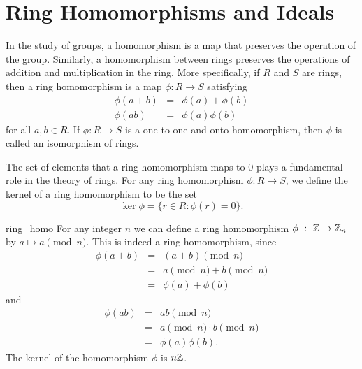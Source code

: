  
 
\section{Ring Homomorphisms and Ideals}
 
 
In the study of groups, a homomorphism is a map that preserves the
operation of the group.  Similarly, a homomorphism between rings
preserves the operations of addition and multiplication in the ring.
More specifically, if  $R$ and $S$ are rings, then   a {\bfi ring
homomorphism\/} is a
map $\phi : R \rightarrow S$ satisfying  
\begin{eqnarray*}
\phi( a + b ) & = & \phi( a ) + \phi(b) \\
\phi( a b ) & = & \phi( a ) \phi(b)
\end{eqnarray*}
for all $a, b \in R$.  
If $\phi : R \rightarrow S$ is a one-to-one and onto homomorphism,
then $\phi$ is called an {\bfi
isomorphism\/} of rings.   
 
 
The set of elements that a ring homomorphism maps to $0$ plays a
fundamental role in the theory of rings. For any ring homomorphism
$\phi : R \rightarrow S$, we define the {\bfi
kernel\/} of a ring homomorphism to be the set
\[
\ker \phi = \{ r \in R : \phi( r ) = 0 \}.
\]
 
 
\begin{example}{ring_homo}
For any integer $n$ we can define a ring homomorphism $\phi~:~{\Bbb Z}
\rightarrow {\Bbb Z}_n$ by $a \mapsto a \pmod{n}$. This is indeed a
ring homomorphism, since 
\begin{eqnarray*}
\phi( a + b )  & = & (a + b) \pmod{n} \\
 & = &  a \pmod{n} + b \pmod{n}\\
 & = & \phi( a ) + \phi(b)
\end{eqnarray*}
and
\begin{eqnarray*}
\phi( a b )  & = &  ab \pmod{n} \\
 & = & a \pmod{n}\cdot  b \pmod{n} \\
 & = & \phi( a ) \phi(b).
\end{eqnarray*}
The kernel of the homomorphism $\phi$ is $n {\Bbb Z}$.
\end{example}
 
